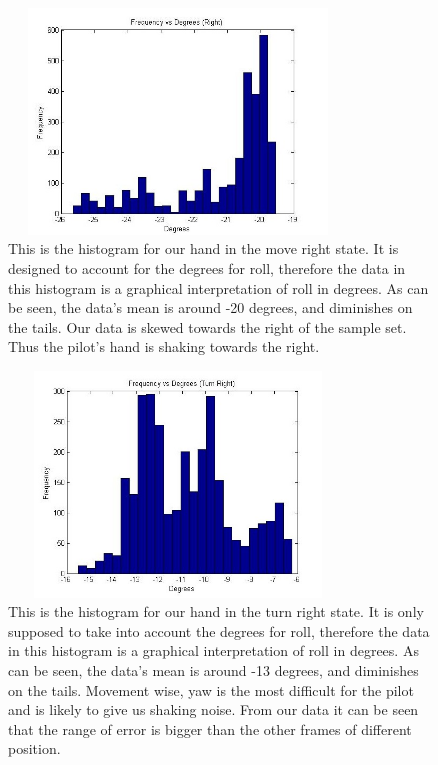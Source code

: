 \documentclass[letterpaper,english, 12pt]{article}
\begin{document}
\begin{figure}[H]
	\centering
	\includegraphics[height=6cm,width=90mm]{pics/rightHistogram1.jpg}
	\caption{This is the histogram for our hand in the move right state. It is designed to account for the degrees for roll, therefore the data in this histogram is a graphical interpretation of roll in degrees.  As can be seen, the data's mean is around -20 degrees, and diminishes on the tails. 
Our data is skewed towards the right of the sample set. Thus the pilot's hand is shaking towards the right. }

\end{figure}

\begin{figure}[H]
	\centering
	\includegraphics[height=6cm,width=90mm]{pics/turnRightHistogram1.jpg}
	\caption{This is the histogram for our hand in the turn right state. It is only supposed to take into account the degrees for roll, therefore the data in this histogram is a graphical interpretation of roll in degrees.  As can be seen, the data's mean is around -13 degrees, and diminishes on the tails. Movement wise, yaw is the most difficult for the pilot and is likely to give us shaking noise.  From our data it can be seen that the range of error is bigger than the other frames of different position.}
\end{figure}
\end{document}
